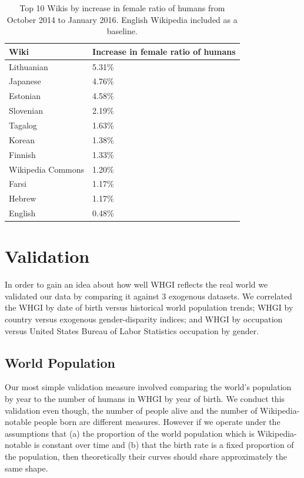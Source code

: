 \documentclass[letterpaper]{article}
\begin{document}
\begin{table}
\caption{Top 10 Wikis by increase in female ratio of humans from October 2014 to January 2016. English Wikipedia included as a baseline.}
\label{table:top10}
\begin{tabular}{p{2cm}p{2cm}}
\toprule
{Wiki} &     Increase in female ratio of humans  \\
\midrule
Lithuanian      & 5.31\% \\
Japanese     & 4.76\% \\
Estonian      & 4.58\% \\
Slovenian      & 2.19\% \\
Tagalog      & 1.63\% \\
Korean      & 1.38\% \\
Finnish      & 1.33\% \\
Wikipedia Commons & 1.20\% \\
Farsi      & 1.17\% \\
Hebrew      & 1.17\% \\
English      & 0.48\% \\
\bottomrule
\end{tabular}
\end{table}

\section{Validation}
In order to gain an idea about how well WHGI reflects the real world we validated our data by comparing it against 3 exogenous datasets. We correlated the WHGI by date of birth versus historical world population trends; WHGI by country versus exogenous gender-disparity indices; and WHGI by occupation versus United States Bureau of Labor Statistics occupation by gender.

\subsection{World Population} Our most simple validation measure involved comparing the world's population by year to the number of humans in WHGI by year of birth. We conduct this validation even though, the number of people alive and the number of Wikipedia-notable people born are different measures. However if we operate under the assumptions that (a) the proportion of the world population which is Wikipedia-notable is constant over time and (b) that the birth rate is a fixed proportion of the population, then theoretically their curves should share approximately the same shape. 
\end{document}
